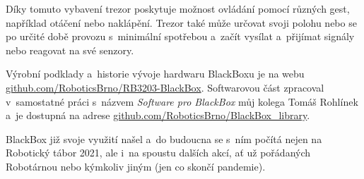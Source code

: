 Díky tomuto vybavení trezor poskytuje možnost 
ovládání pomocí různých gest, například otáčení nebo naklápění. 
Trezor také může určovat svoji polohu nebo se po určité době 
provozu s~minimální spotřebou  a~začít vysílat a~přijímat signály nebo reagovat na své senzory.

Výrobní podklady a~historie vývoje hardwaru BlackBoxu je na webu 
\href{https://github.com/RoboticsBrno/RB3203-BlackBox}{github.com/RoboticsBrno/RB3203-BlackBox}.
Softwarovou část zpracoval v~samostatné práci s~názvem \textit{Software pro BlackBox} můj kolega Tomáš Rohlínek 
a~je dostupná na adrese 
\href{https://github.com/RoboticsBrno/BlackBox_library}{github.com/RoboticsBrno/BlackBox\_library}.

BlackBox již svoje využití našel a~do budoucna se s~ním počítá nejen na Robotický tábor 2021, 
ale i~na spoustu dalších akcí, ať už pořádaných Robotárnou nebo kýmkoliv jiným  (jen co skončí pandemie). 



